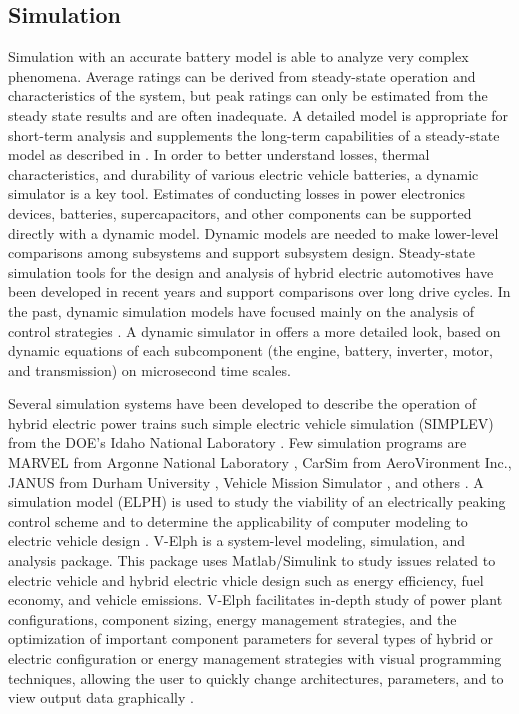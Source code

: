 \subsection{Simulation}

Simulation with an accurate battery model is able to analyze very complex phenomena. Average ratings can be
derived from steady-state operation and characteristics of the
system, but peak ratings can only be estimated from the steady state results and are often inadequate. A detailed model is appropriate for short-term
analysis and supplements the long-term capabilities of a
steady-state model as described in \cite{ZS_wip,ZS_adv}.  In order to better understand losses, thermal
characteristics, and durability of various  electric vehicle batteries, a
dynamic simulator is a key tool. Estimates of conducting losses in
power electronics devices, batteries, supercapacitors, and other components can be supported directly with a dynamic model. 
Dynamic models are needed to make lower-level comparisons
among subsystems and support subsystem design. Steady-state simulation tools for the design and analysis of
hybrid electric automotives have been developed in recent years and support comparisons over long drive cycles. In the past, dynamic
simulation models have focused mainly on the analysis of
control strategies \cite{ZS_amr}. A dynamic simulator in \cite{ZS_log} offers a more
detailed look, based on dynamic equations of each
subcomponent (the engine, battery, inverter, motor, and
transmission) on microsecond time scales.

Several simulation systems have been
developed to describe the operation of hybrid electric power
trains such simple electric vehicle simulation (SIMPLEV) from
the DOE’s Idaho National Laboratory \cite{ZS_col}. Few simulation programs are MARVEL from
Argonne National Laboratory \cite{ZS_wal}, CarSim from AeroVironment
Inc., JANUS from Durham University \cite{ZS_bum}, 
Vehicle Mission Simulator \cite{ZS_noo}, and others \cite{ZS_aue,ZS_kri}. A
simulation model (ELPH) is used to study the viability of an electrically
peaking control scheme and to determine the applicability of
computer modeling to electric vehicle design \cite{ZS_bun}. V-Elph \cite{ZS_ste,ZS_but} is a system-level modeling, simulation,
and analysis package. This package uses Matlab/Simulink to study issues related to electric vehicle and
hybrid electric vhicle design such as energy efficiency, fuel economy, and
vehicle emissions. V-Elph facilitates in-depth study of power
plant configurations, component sizing, energy management
strategies, and the optimization of important component parameters
for several types of hybrid or electric configuration
or energy management strategies with visual programming
techniques, allowing the user to quickly change architectures,
parameters, and to view output data graphically \cite{Butler:TVT99}.

